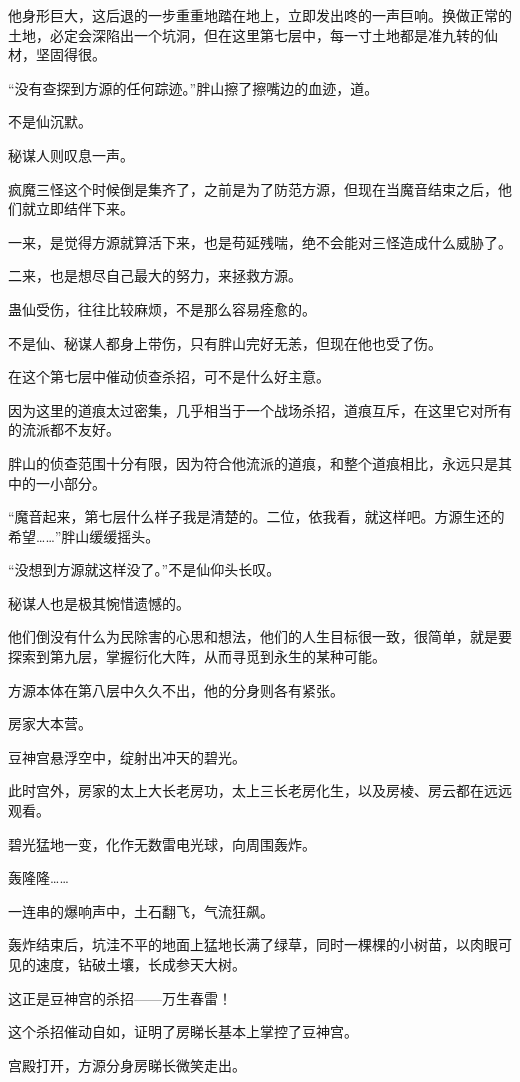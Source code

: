 \begin{this_body}
他身形巨大，这后退的一步重重地踏在地上，立即发出咚的一声巨响。换做正常的土地，必定会深陷出一个坑洞，但在这里第七层中，每一寸土地都是准九转的仙材，坚固得很。

“没有查探到方源的任何踪迹。”胖山擦了擦嘴边的血迹，道。

不是仙沉默。

秘谋人则叹息一声。

疯魔三怪这个时候倒是集齐了，之前是为了防范方源，但现在当魔音结束之后，他们就立即结伴下来。

一来，是觉得方源就算活下来，也是苟延残喘，绝不会能对三怪造成什么威胁了。

二来，也是想尽自己最大的努力，来拯救方源。

蛊仙受伤，往往比较麻烦，不是那么容易痊愈的。

不是仙、秘谋人都身上带伤，只有胖山完好无恙，但现在他也受了伤。

在这个第七层中催动侦查杀招，可不是什么好主意。

因为这里的道痕太过密集，几乎相当于一个战场杀招，道痕互斥，在这里它对所有的流派都不友好。

胖山的侦查范围十分有限，因为符合他流派的道痕，和整个道痕相比，永远只是其中的一小部分。

“魔音起来，第七层什么样子我是清楚的。二位，依我看，就这样吧。方源生还的希望……”胖山缓缓摇头。

“没想到方源就这样没了。”不是仙仰头长叹。

秘谋人也是极其惋惜遗憾的。

他们倒没有什么为民除害的心思和想法，他们的人生目标很一致，很简单，就是要探索到第九层，掌握衍化大阵，从而寻觅到永生的某种可能。

方源本体在第八层中久久不出，他的分身则各有紧张。

房家大本营。

豆神宫悬浮空中，绽射出冲天的碧光。

此时宫外，房家的太上大长老房功，太上三长老房化生，以及房棱、房云都在远远观看。

碧光猛地一变，化作无数雷电光球，向周围轰炸。

轰隆隆……

一连串的爆响声中，土石翻飞，气流狂飙。

轰炸结束后，坑洼不平的地面上猛地长满了绿草，同时一棵棵的小树苗，以肉眼可见的速度，钻破土壤，长成参天大树。

这正是豆神宫的杀招——万生春雷！

这个杀招催动自如，证明了房睇长基本上掌控了豆神宫。

宫殿打开，方源分身房睇长微笑走出。


\end{this_body}
